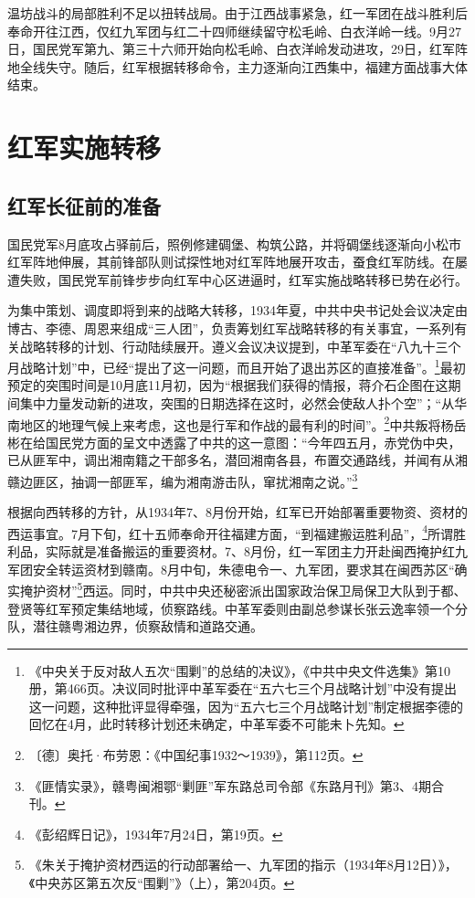 温坊战斗的局部胜利不足以扭转战局。由于江西战事紧急，红一军团在战斗胜利后奉命开往江西，仅红九军团与红二十四师继续留守松毛岭、白衣洋岭一线。9月27日，国民党军第九、第三十六师开始向松毛岭、白衣洋岭发动进攻，29日，红军阵地全线失守。随后，红军根据转移命令，主力逐渐向江西集中，福建方面战事大体结束。

\section{红军实施转移}

\subsection{红军长征前的准备}


国民党军8月底攻占驿前后，照例修建碉堡、构筑公路，并将碉堡线逐渐向小松市红军阵地伸展，其前锋部队则试探性地对红军阵地展开攻击，蚕食红军防线。在屡遭失败，国民党军前锋步步向红军中心区进逼时，红军实施战略转移已势在必行。


为集中策划、调度即将到来的战略大转移，1934年夏，中共中央书记处会议决定由博古、李德、周恩来组成“三人团”，负责筹划红军战略转移的有关事宜，一系列有关战略转移的计划、行动陆续展开。遵义会议决议提到，中革军委在“八九十三个月战略计划”中，已经“提出了这一问题，而且开始了退出苏区的直接准备”。\footnote{《中央关于反对敌人五次“围剿”的总结的决议》，《中共中央文件选集》第10册，第466页。决议同时批评中革军委在“五六七三个月战略计划”中没有提出这一问题，这种批评显得牵强，因为“五六七三个月战略计划”制定根据李德的回忆在4月，此时转移计划还未确定，中革军委不可能未卜先知。}最初预定的突围时间是10月底11月初，因为“根据我们获得的情报，蒋介石企图在这期间集中力量发动新的进攻，突围的日期选择在这时，必然会使敌人扑个空”；“从华南地区的地理气候上来考虑，这也是行军和作战的最有利的时间”。\footnote{〔德〕奥托·布劳恩：《中国纪事1932～1939》，第112页。}中共叛将杨岳彬在给国民党方面的呈文中透露了中共的这一意图：“今年四五月，赤党伪中央，已从匪军中，调出湘南籍之干部多名，潜回湘南各县，布置交通路线，并闻有从湘赣边匪区，抽调一部匪军，编为湘南游击队，窜扰湘南之说。”\footnote{《匪情实录》，赣粤闽湘鄂“剿匪”军东路总司令部《东路月刊》第3、4期合刊。}


根据向西转移的方针，从1934年7、8月份开始，红军已开始部署重要物资、资材的西运事宜。7月下旬，红十五师奉命开往福建方面，“到福建搬运胜利品”，\footnote{《彭绍辉日记》，1934年7月24日，第19页。}所谓胜利品，实际就是准备搬运的重要资材。7、8月份，红一军团主力开赴闽西掩护红九军团安全转运资材到赣南。8月中旬，朱德电令一、九军团，要求其在闽西苏区“确实掩护资材”\footnote{《朱关于掩护资材西运的行动部署给一、九军团的指示（1934年8月12日）》，《中央苏区第五次反“围剿”》（上），第204页。}西运。同时，中共中央还秘密派出国家政治保卫局保卫大队到于都、登贤等红军预定集结地域，侦察路线。中革军委则由副总参谋长张云逸率领一个分队，潜往赣粤湘边界，侦察敌情和道路交通。



